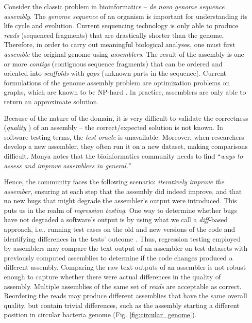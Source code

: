 \documentclass[12pt,\mydriver]{thesis}
\begin{document}
Consider the classic problem in bioinformatics -- {\it de novo genome sequence assembly}.  The
{\it genome sequence} of an organism is important for understanding its life
cycle and evolution.  Current sequencing technology is only able to produce
{\it reads} (sequenced fragments) that are drastically shorter than the genome.
Therefore, in order to carry out meaningful biological analyses, one must first
{\it assemble} the original genome using {\it assemblers}.  The result of the
assembly is one or more {\it contigs} (contiguous sequence fragments) that can
be ordered and oriented into {\it scaffolds} with {\it gaps} (unknown parts in
the sequence).  Current formulations of the genome assembly problem are
optimization problems on graphs, which are known to be NP-hard
\cite{medvedev2007computability}.  In practice, assemblers are only able to
return an approximate solution.

Because of the nature of the domain, it is very difficult to validate the
correctness ({\it quality} \cite{monya2012}) of an assembly -- the
correct/expected solution is not known.  In software testing terms, the {\it
test oracle} is unavailable.
Moreover, when researchers develop a new
assembler, they often run it on a new dataset, making comparisons difficult.
Monya \cite{monya2012} notes that the bioinformatics community needs to find
``{\it ways to assess and improve assemblers in general.}''

Hence, the community faces the following scenario: {\it iteratively improve
the assember}, ensuring at each step that the assembly did indeed improve, and
that no new bugs that might degrade the assembler's output were introduced.
This puts us in the realm of {\it regression testing}.  One way to determine
whether bugs have not degraded a software's output is by using what we call a
{\it diff}-based approach, i.e., running test cases on the old and new versions
of the code and identifying differences in the tests' outcome
\cite{Orso:2008:BBR:1401827.1401835}.  Thus, regression testing employed by
assemblers may compare the text output of an assembler on test datasets with
previously computed assemblies to determine if the code changes produced a
different assembly.  Comparing the raw text outputs of an assembler is not
robust enough to capture whether there were actual differences in the quality
of assembly. Multiple assemblies of the same set of \emph{reads} are acceptable as correct. Reordering the reads may produce different
assemblies that have the same overall quality, but contain trivial differences,
such as the assembly starting a different position in circular bacteria genome (Fig. \ref{fig:circular_genome}).
\end{document}
